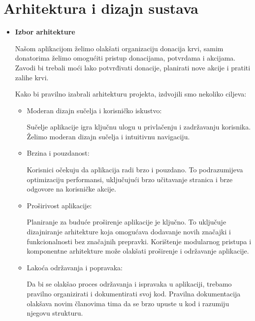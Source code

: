 \section{Arhitektura i dizajn sustava}

\begin{itemize}
	\item \textbf{Izbor arhitekture}
	      	      
	      Našom aplikacijom želimo olakšati organizaciju donacija krvi, samim
	      donatorima želimo omogućiti pristup donacijama, potvrdama i akcijama.
	      Zavodi bi trebali moći lako potvrđivati donacije, planirati nove akcije i pratiti
	      zalihe krvi.
	      	      
	      Kako bi pravilno izabrali arhitekturu projekta, izdvojili smo nekoliko
	      ciljeva:
	      \begin{itemize}
	      	\item Moderan dizajn sučelja i korisničko iskustvo:
	      	      	      	      
	      	      Sučelje aplikacije igra ključnu ulogu u privlačenju i zadržavanju korisnika.
	      	      Želimo moderan dizajn sučelja i intuitivnu navigaciju.
	      	      	      	      
	      	\item Brzina i pouzdanost:
	      	      	      	      
	      	      Korisnici očekuju da aplikacija radi brzo i pouzdano. To podrazumijeva
	      	      optimizaciju performansi, uključujući brzo učitavanje stranica i brze odgovore
	      	      na korisničke akcije.
	      	      	      	      
	      	\item Proširivost aplikacije:
	      	      	      	      
	      	      Planiranje za buduće proširenje aplikacije je ključno. To uključuje
	      	      dizajniranje arhitekture koja omogućava dodavanje novih značajki i
	      	      funkcionalnosti bez značajnih prepravki. Korištenje modularnog pristupa
	      	      i komponentne arhitekture može olakšati proširenje i održavanje aplikacije.
	      	      	      	      
	      	\item Lakoća održavanja i popravaka:
	      	      	      	      
	      	      Da bi se olakšao proces održavanja i ispravaka u aplikaciji, trebamo
	      	      pravilno organizirati i dokumentirati svoj kod. Pravilna dokumentacija
	      	      olakšava novim članovima tima da se brzo upuste u kod i razumiju njegovu
	      	      strukturu.
	      	      	      	      

\end{itemize}
\end{itemize}
